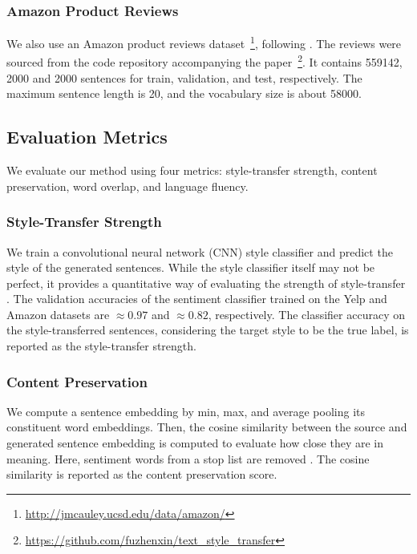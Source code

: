 \documentclass[letterpaper]{article} %
\newcommand{\citeay}[1]{\citeauthor{#1} \shortcite{#1}}
\begin{document}
\subsubsection{Amazon Product Reviews}

We also use an Amazon product reviews dataset~\footnote{\url{http://jmcauley.ucsd.edu/data/amazon/}}, following \citeay{fu2017style}. The reviews were sourced from the code repository accompanying the paper~\footnote{\url{https://github.com/fuzhenxin/text_style_transfer}}. It contains 559142, 2000 and 2000 sentences for train, validation, and test, respectively. The maximum sentence length is 20, and the vocabulary size is about 58000.

\subsection{Evaluation Metrics}

We evaluate our method using four metrics: style-transfer strength, content preservation, word overlap, and language fluency.

\subsubsection{Style-Transfer Strength}
We train a convolutional neural network (CNN) style classifier \cite{kim2014convolutional} and predict the style of the generated sentences. While the style classifier itself may not be perfect, it provides a quantitative way of evaluating the strength of style-transfer \cite{hu2017toward,shen2017style,fu2017style}. The validation accuracies of the sentiment classifier trained on the Yelp and Amazon datasets are $\approx 0.97$ and $\approx 0.82$, respectively. The classifier accuracy on the style-transferred sentences, considering the target style to be the true label, is reported as the style-transfer strength.

\subsubsection{Content Preservation}
We compute a sentence embedding by min, max, and average pooling its constituent word embeddings. Then, the cosine similarity between the source and generated sentence embedding is computed to evaluate how close they are in meaning. Here, sentiment words from a stop list \cite{hu2004mining} are removed \cite{fu2017style}. The cosine similarity is reported as the content preservation score.
\end{document}
